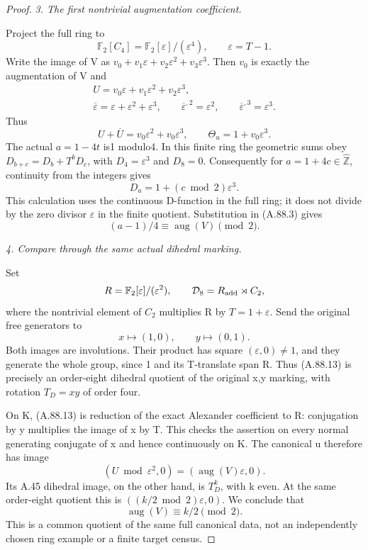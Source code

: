 \begin{proof}
\emph{3. The first nontrivial augmentation coefficient.}\par
Project the full ring to
\[
                \mathbb F_2[C_4]=\mathbb F_2[\varepsilon]/(\varepsilon^4),
                \qquad\varepsilon=T-1.
\]
Write the image of V as
\(v_0+v_1\varepsilon+v_2\varepsilon^2+v_3\varepsilon^3\).
Then \(v_0\) is exactly the augmentation of V and
\[
 \begin{gathered}
 U=v_0\varepsilon+v_1\varepsilon^2+v_2\varepsilon^3,\\
 \overline\varepsilon=\varepsilon+\varepsilon^2+\varepsilon^3,
 \qquad \overline\varepsilon^{,2}=\varepsilon^2,
 \qquad \overline\varepsilon^{,3}=\varepsilon^3.
 \end{gathered}
\]
Thus
\[
                 U+\overline U=v_0\varepsilon^2+v_0\varepsilon^3,
                 \qquad\Theta_u=1+v_0\varepsilon^3.
 \tag{A.88.10}
\]
The actual \(a=1-4t\) is1 modulo4. In this finite ring the
geometric sums obey
\(D_{b+c}=D_b+T^bD_c\), with
\(D_4=\varepsilon^3\) and \(D_8=0\). Consequently for
\(a=1+4c\in\widehat{\mathbb Z}\), continuity from the integers gives
\[
                     D_a=1+(c\bmod2)\varepsilon^3.
 \tag{A.88.11}
\]
This calculation uses the continuous D-function in the full ring;
it does not divide by the zero divisor \(\varepsilon\) in the
finite quotient. Substitution in (A.88.3) gives
\[
                         (a-1)/4\equiv\operatorname{aug}(V)\pmod2.
 \tag{A.88.12}
\]

\emph{4. Compare through the same actual dihedral marking.}\par
Set
\[
 R=\mathbb F_2[\varepsilon]/(\varepsilon^2),\qquad
 \mathcal D_8=R_{\rm add}\rtimes C_2,
\]
where the nontrivial element of \(C_2\) multiplies R by
\(T=1+\varepsilon\). Send the original free generators to
\[
                          x\longmapsto(1,0),\qquad
                          y\longmapsto(0,1).
 \tag{A.88.13}
\]
Both images are involutions. Their product has square
\((\varepsilon,0)\ne1\), and they generate the whole group, since
1 and its T-translate span R. Thus (A.88.13) is precisely an
order-eight dihedral quotient of the original x,y marking, with
rotation \(T_D=xy\) of order four.

On K, (A.88.13) is reduction of the exact Alexander coefficient
to R: conjugation by y multiplies the image of x by T. This checks
the assertion on every normal generating conjugate of x and hence
continuously on K. The canonical u therefore has image
\[
                  (U\bmod\varepsilon^2,0)
                    =(\operatorname{aug}(V)\varepsilon,0).
\]
Its A.45 dihedral image, on the other hand, is \(T_D^k\), with k
even. At the same order-eight quotient this is
\(((k/2\bmod2)\varepsilon,0)\). We conclude that
\[
                         \operatorname{aug}(V)\equiv k/2\pmod2.
 \tag{A.88.14}
\]
This is a common quotient of the same full canonical data, not
an independently chosen ring example or a finite target census.


\end{proof}
